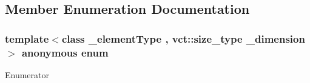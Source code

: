 \subsection{Member Enumeration Documentation}
\hypertarget{classvct_dynamic_n_array_ref_owner_a80e01cf6b29f06f8909c10a950de8878}{\subsubsection[{anonymous enum}]{\setlength{\rightskip}{0pt plus 5cm}template$<$class \-\_\-element\-Type , vct\-::size\-\_\-type \-\_\-dimension$>$ anonymous enum}}\label{classvct_dynamic_n_array_ref_owner_a80e01cf6b29f06f8909c10a950de8878}
\begin{Desc}
\item[Enumerator]\par
\begin{description}
\item[{\em 
\hypertarget{classvct_dynamic_n_array_ref_owner_a80e01cf6b29f06f8909c10a950de8878a189e6a50792859079c88592f0c2ab19b}{D\-I\-M\-E\-N\-S\-I\-O\-N}\label{classvct_dynamic_n_array_ref_owner_a80e01cf6b29f06f8909c10a950de8878a189e6a50792859079c88592f0c2ab19b}
}]\end{description}
\end{Desc}


